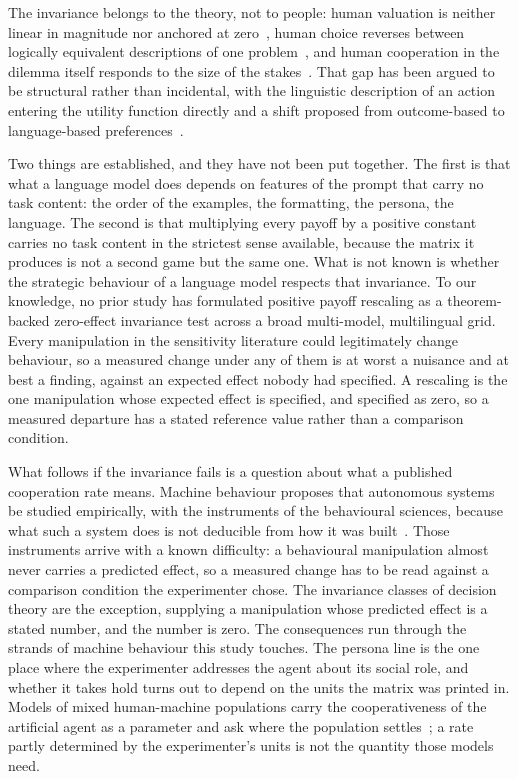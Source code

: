 \documentclass[openacc]{rsproca_new}
\begin{document}
The invariance belongs to the theory, not to people: human valuation is neither
linear in magnitude nor anchored at zero~\cite{kahneman1979prospect}, human
choice reverses between logically equivalent descriptions of one
problem~\cite{tversky1981framing}, and human cooperation in the dilemma itself
responds to the size of the stakes~\cite{krockow2016cooperation,list2006friend}.
That gap has been argued to be structural rather than incidental, with the
linguistic description of an action entering the utility function directly and
a shift proposed from outcome-based to language-based
preferences~\cite{capraro2024language}.

Two things are established, and they have not been put together. The first is
that what a language model does depends on features of the prompt that carry no
task content: the order of the examples, the formatting, the persona, the
language. The second is that multiplying every payoff by a positive constant
carries no task content in the strictest sense available, because the matrix it
produces is not a second game but the same one. What is not known is whether
the strategic behaviour of a language model respects that invariance. To our
knowledge, no prior study has formulated positive payoff rescaling as a
theorem-backed zero-effect invariance test across a broad multi-model,
multilingual grid. Every manipulation in the sensitivity literature
could legitimately change behaviour, so a measured change under any of them is
at worst a nuisance and at best a finding, against an expected effect nobody
had specified. A rescaling is the one manipulation whose expected effect is
specified, and specified as zero, so a measured departure has a stated
reference value rather than a comparison condition.

What follows if the invariance fails is a question about what a published
cooperation rate means. Machine behaviour proposes that autonomous systems be
studied empirically, with the instruments of the behavioural sciences, because
what such a system does is not deducible from how it was
built~\cite{rahwan2019machine}. Those instruments arrive with a known
difficulty: a behavioural manipulation almost never carries a predicted effect,
so a measured change has to be read against a comparison condition the
experimenter chose. The invariance classes of decision theory are the
exception, supplying a manipulation whose predicted effect is a stated number,
and the number is zero. The consequences run through the strands of machine
behaviour this study touches. The persona line is the one place where the
experimenter addresses the agent about its social role, and whether it takes
hold turns out to depend on the units the matrix was printed in. Models of
mixed human-machine populations carry the cooperativeness of the artificial agent as
a parameter and ask where the population
settles~\cite{santos2018social,han2011intention,han2013good,perc2017statistical,paiva2018engineering};
a rate partly determined by the experimenter's units is not the quantity those
models need.
\end{document}

